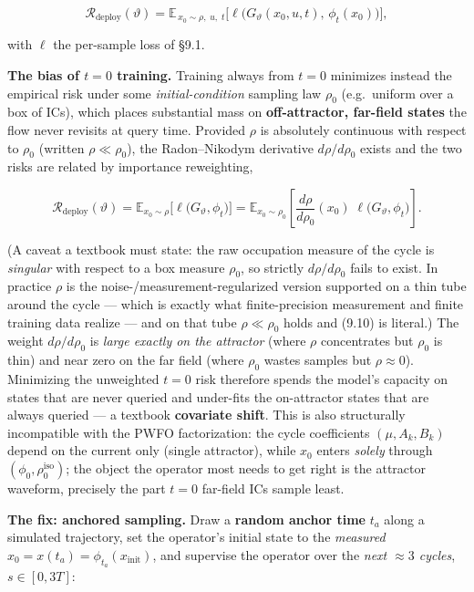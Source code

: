 \documentclass[
  11pt,
]{article}
\begin{document}
\[
\mathcal{R}_{\text{deploy}}(\vartheta)
=\mathbb{E}_{\,x_0\sim\rho,\;u,\;t}\Big[\ell\big(G_\vartheta(x_0,u,t),\,\phi_t(x_0)\big)\Big],
\tag{9.9}
\]

with \(\ell\) the per-sample loss of §9.1.

\textbf{The bias of \(t=0\) training.} Training always from \(t=0\)
minimizes instead the empirical risk under some \emph{initial-condition}
sampling law \(\rho_0\) (e.g.~uniform over a box of ICs), which places
substantial mass on \textbf{off-attractor, far-field states} the flow
never revisits at query time. Provided \(\rho\) is absolutely continuous
with respect to \(\rho_0\) (written \(\rho\ll\rho_0\)), the
Radon--Nikodym derivative \(d\rho/d\rho_0\) exists and the two risks are
related by importance reweighting,

\[
\mathcal{R}_{\text{deploy}}(\vartheta)
=\mathbb{E}_{x_0\sim\rho}\big[\ell\big(G_\vartheta,\phi_t\big)\big]
=\mathbb{E}_{x_0\sim\rho_0}\!\left[\frac{d\rho}{d\rho_0}(x_0)\;\ell\big(G_\vartheta,\phi_t\big)\right].
\tag{9.10}
\]

(A caveat a textbook must state: the raw occupation measure of the cycle
is \emph{singular} with respect to a box measure \(\rho_0\), so strictly
\(d\rho/d\rho_0\) fails to exist. In practice \(\rho\) is the
noise-/measurement-regularized version supported on a thin tube around
the cycle --- which is exactly what finite-precision measurement and
finite training data realize --- and on that tube \(\rho\ll\rho_0\)
holds and (9.10) is literal.) The weight \(d\rho/d\rho_0\) is
\emph{large exactly on the attractor} (where \(\rho\) concentrates but
\(\rho_0\) is thin) and near zero on the far field (where \(\rho_0\)
wastes samples but \(\rho\approx 0\)). Minimizing the unweighted \(t=0\)
risk therefore spends the model's capacity on states that are never
queried and under-fits the on-attractor states that are always queried
--- a textbook \textbf{covariate shift}. This is also structurally
incompatible with the PWFO factorization: the cycle coefficients
\((\mu,A_k,B_k)\) depend on the current only (single attractor), while
\(x_0\) enters \emph{solely} through \((\phi_0,\rho_0^{\text{iso}})\);
the object the operator most needs to get right is the attractor
waveform, precisely the part \(t=0\) far-field ICs sample least.

\textbf{The fix: anchored sampling.} Draw a \textbf{random anchor time}
\(t_a\) along a simulated trajectory, set the operator's initial state
to the \emph{measured} \(x_0=x(t_a)=\phi_{t_a}(x_{\text{init}})\), and
supervise the operator over the \emph{next \(\approx 3\) cycles},
\(s\in[0,3T]\):
\end{document}
